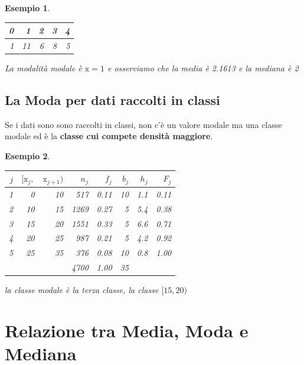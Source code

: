 \documentclass[
  11pt,
]{book}
\theoremstyle{mytheoremstyle}
\theoremstyle{mydefstyle}
\newtheorem{example}{{Esempio}}[section]
\begin{document}
\begin{example}
\(\phantom{2}\)

\begin{tabular}{rrrrr}
\toprule
0 & 1 & 2 & 3 & 4\\
\midrule
1 & 11 & 6 & 8 & 5\\
\bottomrule
\end{tabular}

La modalità modale è \(\mathrm{x} = 1\) e osserviamo che la media è 2.1613 e la mediana è 2
\end{example}

\subsection{La Moda per dati raccolti in classi}\label{la-moda-per-dati-raccolti-in-classi}

\begin{info}
Se i dati sono sono raccolti in classi, non c'è un valore modale ma una classe modale ed è la \textbf{classe cui compete densità maggiore}.

\end{info}

\begin{example}
\(\phantom{2}\)

\begin{table}[H]
\centering
\begin{tabular}{rrrrrrrr}
\toprule
$j$ & $[\text{x}_j,$ & $\text{x}_{j+1})$ & $n_j$ & $f_j$ & $b_j$ & $h_j$ & $F_j$\\
\midrule
1 & 0 & 10 & 517 & 0.11 & 10 & 1.1 & 0.11\\
2 & 10 & 15 & 1269 & 0.27 & 5 & 5.4 & 0.38\\
3 & 15 & 20 & 1551 & 0.33 & 5 & 6.6 & 0.71\\
4 & 20 & 25 & 987 & 0.21 & 5 & 4.2 & 0.92\\
5 & 25 & 35 & 376 & 0.08 & 10 & 0.8 & 1.00\\
 &  &  & 4700 & 1.00 & 35 &  & \\
\bottomrule
\end{tabular}
\end{table}

la classe modale è la terza classe, la classe \([15,20)\)
\end{example}

\section{Relazione tra Media, Moda e Mediana}\label{relazione-tra-media-moda-e-mediana}
\end{document}
